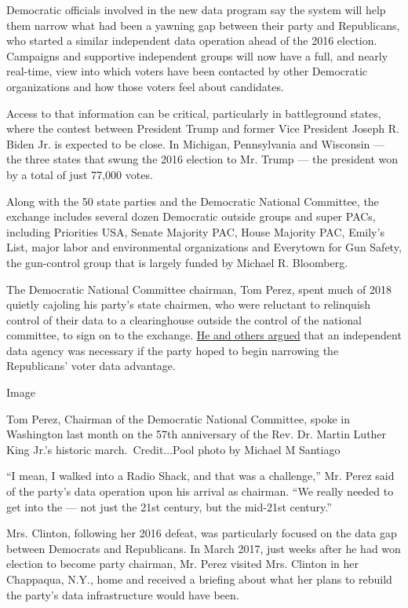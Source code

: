 Democratic officials involved in the new data program say the system
will help them narrow what had been a yawning gap between their party
and Republicans, who started a similar independent data operation ahead
of the 2016 election. Campaigns and supportive independent groups will
now have a full, and nearly real-time, view into which voters have been
contacted by other Democratic organizations and how those voters feel
about candidates.

Access to that information can be critical, particularly in battleground
states, where the contest between President Trump and former Vice
President Joseph R. Biden Jr. is expected to be close. In Michigan,
Pennsylvania and Wisconsin --- the three states that swung the 2016
election to Mr. Trump --- the president won by a total of just 77,000
votes.

Along with the 50 state parties and the Democratic National Committee,
the exchange includes several dozen Democratic outside groups and super
PACs, including Priorities USA, Senate Majority PAC, House Majority PAC,
Emily's List, major labor and environmental organizations and Everytown
for Gun Safety, the gun-control group that is largely funded by Michael
R. Bloomberg.

The Democratic National Committee chairman, Tom Perez, spent much of
2018 quietly cajoling his party's state chairmen, who were reluctant to
relinquish control of their data to a clearinghouse outside the control
of the national committee, to sign on to the exchange.
\href{https://www.nytimes3xbfgragh.onion/2019/02/14/us/politics/on-politics-democratic-data-sharing-2020.html}{He
and others argued} that an independent data agency was necessary if the
party hoped to begin narrowing the Republicans' voter data advantage.

Image

Tom Perez, Chairman of the Democratic National Committee, spoke in
Washington last month on the 57th anniversary of the Rev. Dr. Martin
Luther King Jr.'s historic march.~Credit...Pool photo by Michael M
Santiago

``I mean, I walked into a Radio Shack, and that was a challenge,'' Mr.
Perez said of the party's data operation upon his arrival as chairman.
``We really needed to get into the --- not just the 21st century, but
the mid-21st century.''

Mrs. Clinton, following her 2016 defeat, was particularly focused on the
data gap between Democrats and Republicans. In March 2017, just weeks
after he had won election to become party chairman, Mr. Perez visited
Mrs. Clinton in her Chappaqua, N.Y., home and received a briefing about
what her plans to rebuild the party's data infrastructure would have
been.

